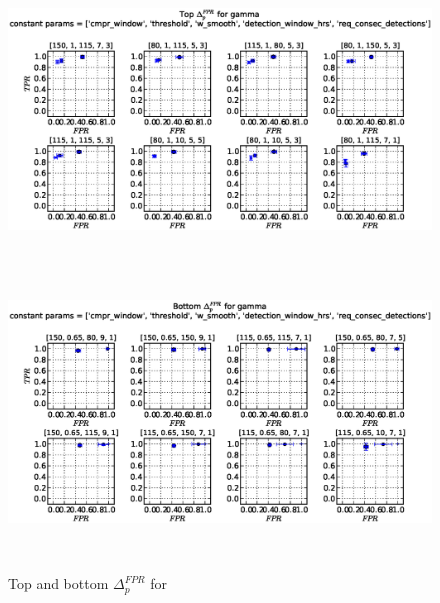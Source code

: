 \begin{figure}[!h]
\begin{center}
\includegraphics[height=3in]{../fig/final/top_fpr/gamma}
\includegraphics[height=3in]{../fig/final/bottom_fpr/gamma}
\end{center}
\caption{\label{fig:delta_top_bottom1f} Top and bottom $\Delta_p^{FPR}$ for }
\end{figure}


